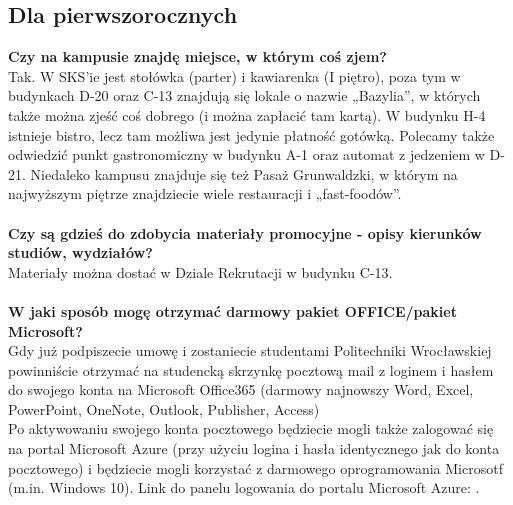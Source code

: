 \documentclass[11pt]{article}
\begin{document}
\subsection{Dla pierwszorocznych}
\textbf{Czy na kampusie znajdę miejsce, w którym coś zjem?}\\
\indent Tak. W SKS’ie jest stołówka (parter) i kawiarenka (I piętro), poza tym w budynkach D-20 oraz C-13 znajdują się lokale o nazwie „Bazylia”, w których także można zjeść coś dobrego (i można zapłacić tam kartą). W budynku H-4 istnieje bistro, lecz tam możliwa jest jedynie płatność gotówką. Polecamy także odwiedzić punkt gastronomiczny w budynku A-1 oraz automat z jedzeniem w D-21. Niedaleko kampusu znajduje się też Pasaż Grunwaldzki, w którym na najwyższym piętrze znajdziecie wiele restauracji i „fast-foodów”. \\\\
\textbf{Czy są gdzieś do zdobycia materiały promocyjne - opisy kierunków studiów, wydziałów?}\\
\indent Materiały można dostać w Dziale Rekrutacji w budynku C-13. \\\\
\textbf{W jaki sposób mogę otrzymać darmowy pakiet OFFICE/pakiet Microsoft?}\\
\indent Gdy już podpiszecie umowę i zostaniecie studentami Politechniki Wrocławskiej powinniście otrzymać na studencką skrzynkę pocztową mail z loginem i hasłem 
do swojego konta na Microsoft Office365 (darmowy najnowszy Word, Excel, PowerPoint, OneNote, Outlook, Publisher, Access)\\
\indent Po aktywowaniu swojego konta pocztowego będziecie mogli także zalogować się 
na portal Microsoft Azure (przy użyciu logina i hasła identycznego jak do konta pocztowego) i będziecie mogli korzystać z darmowego oprogramowania Microsotf 
(m.in. Windows 10). Link do panelu logowania do portalu Microsoft Azure: 
{}.\\
\end{document}
